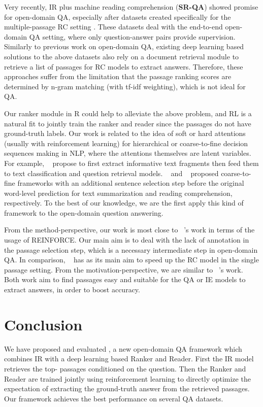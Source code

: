\documentclass[letterpaper]{article} \usepackage{aaai18}  \usepackage{times}  \usepackage{helvet}  \usepackage{courier}  \usepackage{url}  \usepackage{graphicx}  \usepackage{comment}
\begin{document}
Very recently, IR plus machine reading comprehension (\textbf{SR-QA}) showed promise for open-domain QA, especially after datasets created specifically for the multiple-passage RC setting \cite{nguyen2016ms,chen2017reading,JoshiTriviaQA2017,dunn2017searchqa,dhingra2017quasar}.
These datasets deal with the end-to-end open-domain QA setting, where  only question-answer pairs provide supervision.
Similarly to previous work on open-domain QA, existing deep learning based solutions to the above datasets also rely on a document retrieval module to retrieve a list of passages for RC models to extract answers.
Therefore, these approaches suffer from the limitation that the passage ranking scores are determined by n-gram matching (with tf-idf weighting), which is not ideal for QA.

Our ranker module in R
could help to alleviate the above problem, and
RL is a natural fit to jointly train the ranker and reader since the passages do not have ground-truth labels.
Our work is related to the idea of soft or hard attentions (usually with reinforcement learning) for hierarchical or coarse-to-fine decision sequences making in NLP, where the attentions themselves are latent variables. For example, \citeauthor{lei2016rationalizing}~\citeyear{lei2016rationalizing} propose to first extract informative text fragments then feed them to text classification and question retrieval models.
\citeauthor{cheng2016neural}~\citeyear{cheng2016neural} and \citeauthor{choi2017coarse}~\citeyear{choi2017coarse} proposed coarse-to-fine frameworks with an additional sentence selection step before the original word-level prediction for text summarization and reading comprehension, respectively.
To the best of our knowledge, we are the first apply this kind of framework to the open-domain question answering.

From the method-perspective, our work is most close to \citeauthor{choi2017coarse}~\citeyear{choi2017coarse}'s work in terms of the usage of REINFORCE. Our main aim is to deal with the lack of annotation in the passage selection step, which is a necessary intermediate step in open-domain QA. In comparison, \citeauthor{choi2017coarse}~\citeyear{choi2017coarse} has as its main aim to speed up the RC model in the single passage setting. 
From the motivation-perspective, we are similar to \citeauthor{narasimhan-yala-barzilay:2016:EMNLP2016}~\citeyear{narasimhan-yala-barzilay:2016:EMNLP2016}'s work. Both work aim to find passages easy and suitable for the QA or IE models to extract answers, in order to boost accuracy.

\section{Conclusion}
We have proposed and evaluated , a new open-domain QA framework which combines IR with a deep learning based Ranker and Reader. First the IR model retrieves the top- passages conditioned on the question. Then the  Ranker and Reader are trained jointly using reinforcement learning to directly optimize the expectation of extracting the ground-truth answer from the retrieved passages.
Our framework achieves the best performance on several QA datasets. 




\end{document}
